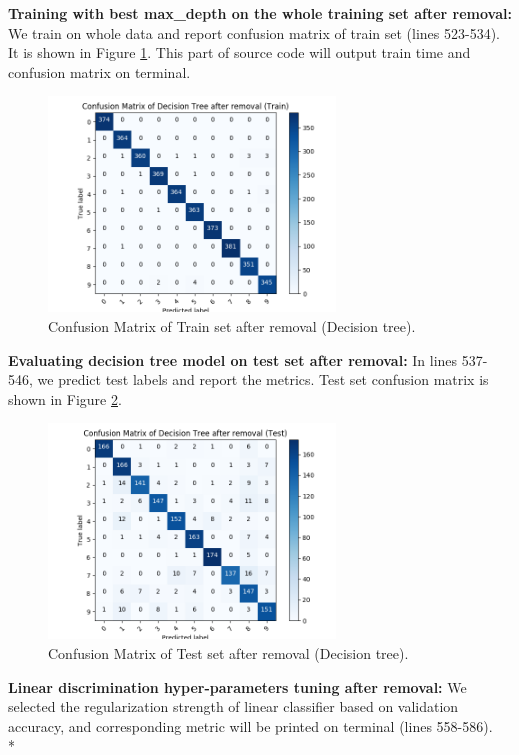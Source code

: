 \documentclass[12pt]{article}
\begin{document}
\textbf{Training with best max\_depth on the whole training set after removal:} We train on whole data and report confusion matrix of train set (lines 523-534). It is shown in Figure \ref{fig:redtreetrain}. This part of source code will output train time and confusion matrix on terminal.
\begin{figure}[ht] 
	\begin{center}
		\includegraphics[width=3in]{redtreetrain.png}
		\caption{Confusion Matrix of Train set after removal (Decision tree).}
		\label{fig:redtreetrain}
	\end{center}
\end{figure} 

\textbf{Evaluating decision tree model on test set after removal:} In lines 537-546, we predict test labels and report the metrics. Test set confusion matrix is shown in Figure \ref{fig:redtreetest}.
\begin{figure}[ht] 
	\begin{center}
		\includegraphics[width=3in]{redtreetest.png}
		\caption{Confusion Matrix of Test set after removal (Decision tree).}
		\label{fig:redtreetest}
	\end{center}
\end{figure} 
\newpage
\textbf{Linear discrimination hyper-parameters tuning after removal:} We selected the regularization strength of linear classifier based on validation accuracy, and corresponding metric will be printed on terminal (lines 558-586).\\*
\end{document}
